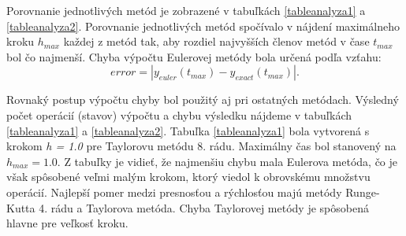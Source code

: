 Porovnanie jednotlivých metód je zobrazené v tabuľkách \ref{tableanalyza1} a \ref{tableanalyza2}. Porovnanie jednotlivých metód spočívalo v nájdení maximálneho kroku $ h_{max} $ každej z metód tak, aby rozdiel najvyšších členov metód v čase $ t_{max} $ bol čo najmenší. Chyba výpočtu Eulerovej metódy bola určená podľa vzťahu:
\begin{equation}
error = |y_{euler}(t_{max}) - y_{exact}(t_{max})|.
\end{equation}
\bigskip

Rovnaký postup výpočtu chyby bol použitý aj pri ostatných metódach. Výsledný počet operácií (stavov) výpočtu a chybu výsledku nájdeme v tabuľkách \ref{tableanalyza1} a \ref{tableanalyza2}. Tabuľka \ref{tableanalyza1} bola vytvorená s krokom \textit{h = 1.0} pre Taylorovu metódu 8. rádu. Maximálny čas bol stanovený na $ h_{max} = 1.0 $. Z tabuľky je vidieť, že najmenšiu chybu mala Eulerova metóda, čo je však spôsobené veľmi malým krokom, ktorý viedol k obrovskému množstvu operácií. Najlepší pomer medzi presnosťou a rýchlosťou majú metódy Runge-Kutta 4. rádu a Taylorova metóda. Chyba Taylorovej metódy je spôsobená hlavne pre veľkosť kroku.


